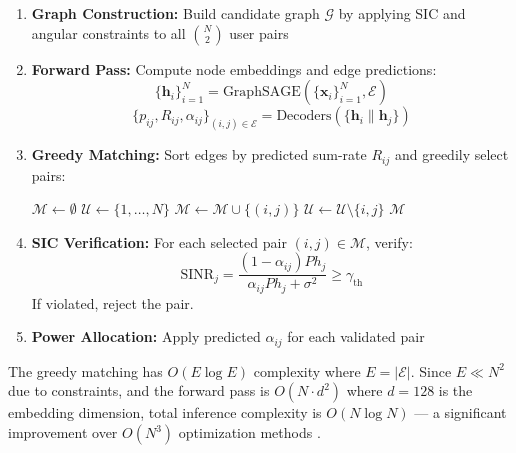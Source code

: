 \documentclass[conference]{IEEEtran}
\begin{document}
\begin{enumerate}
    \item \textbf{Graph Construction:} Build candidate graph $\mathcal{G}$ by applying SIC and angular constraints to all $\binom{N}{2}$ user pairs
    
    \item \textbf{Forward Pass:} Compute node embeddings and edge predictions:
    \begin{equation}
    \{\mathbf{h}_i\}_{i=1}^N = \text{GraphSAGE}(\{\mathbf{x}_i\}_{i=1}^N, \mathcal{E})
    \end{equation}
    \begin{equation}
    \{p_{ij}, R_{ij}, \alpha_{ij}\}_{(i,j) \in \mathcal{E}} = \text{Decoders}(\{\mathbf{h}_i \| \mathbf{h}_j\})
    \end{equation}
    
    \item \textbf{Greedy Matching:} Sort edges by predicted sum-rate $R_{ij}$ and greedily select pairs:
    \begin{algorithmic}
        \State $\mathcal{M} \gets \emptyset$ 
        \State $\mathcal{U} \gets \{1, \ldots, N\}$ 
                \State $\mathcal{M} \gets \mathcal{M} \cup \{(i, j)\}$
                \State $\mathcal{U} \gets \mathcal{U} \setminus \{i, j\}$
            \EndIf
        \EndFor
        \State \Return $\mathcal{M}$
    \end{algorithmic}
    
    \item \textbf{SIC Verification:} For each selected pair $(i, j) \in \mathcal{M}$, verify:
    \begin{equation}
    \text{SINR}_j = \frac{(1-\alpha_{ij}) P h_j}{\alpha_{ij} P h_j + \sigma^2} \geq \gamma_{\text{th}}
    \end{equation}
    If violated, reject the pair.
    
    \item \textbf{Power Allocation:} Apply predicted $\alpha_{ij}$ for each validated pair
\end{enumerate}

The greedy matching has $O(E \log E)$ complexity where $E = |\mathcal{E}|$. Since $E \ll N^2$ due to constraints, and the forward pass is $O(N \cdot d^2)$ where $d=128$ is the embedding dimension, total inference complexity is $O(N \log N)$ \cite{shen2021graph} — a significant improvement over $O(N^3)$ optimization methods \cite{edmonds1965,kuhn1955}.
\end{document}
